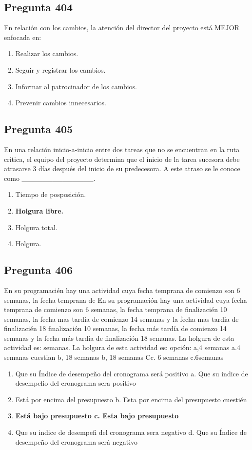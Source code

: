 \documentclass[11pt,a4paper]{article}
\begin{document}
\subsection*{Pregunta 404}
En relación con los cambios, la atención del director del proyecto está MEJOR enfocada en:

\begin{enumerate}[label=\alph*)]
  \item Realizar los cambios.
  \item Seguir y registrar los cambios.
  \item Informar al patrocinador de los cambios.
  \item Prevenir cambios innecesarios.
\end{enumerate}

\subsection*{Pregunta 405}
En una relación inicio-a-inicio entre dos tareas que no se encuentran en la ruta critica, el equipo del proyecto determina que el inicio de la tarea sucesora debe atrasarse 3 días después del inicio de su predecesora. A este atraso se le conoce como \_\_\_\_\_\_\_\_\_\_\_\_\_\_.

\begin{enumerate}[label=\alph*)]
  \item Tiempo de posposición.
  \item \textbf{Holgura libre.}
  \item Holgura total.
  \item Holgura.
\end{enumerate}

\subsection*{Pregunta 406}
En su programacién hay una actividad cuya fecha temprana de comienzo son 6 semanas, la fecha temprana de En su programación hay una actividad cuya fecha temprana de comienzo son 6 semanas, la fecha temprana de finalizacién 10 semanas, la fecha mas tardia de comienzo 14 semanas y la fecha mas tardia de finalizacién 18 finalización 10 semanas, la fecha más tardía de comienzo 14 semanas y la fecha más tardía de finalización 18 semanas. La holgura de esta actividad es: semanas. La holgura de esta actividad es: opción: a,4 semanas a.4 semanas cuestian b, 18 semanas b, 18 semanas Cc. 6 semanas c.6semanas

\begin{enumerate}[label=\alph*)]
  \item Que su Índice de desempeño del cronograma será positivo a. Que su indice de desempefio del cronograma sera positivo
  \item Está por encima del presupuesto b. Esta por encima del presupuesto cuestién
  \item \textbf{Está bajo presupuesto c. Esta bajo presupuesto}
  \item Que su indice de desempefi del cronograma sera negativo d. Que su Índice de desempeño del cronograma será negativo
\end{enumerate}
\end{document}
